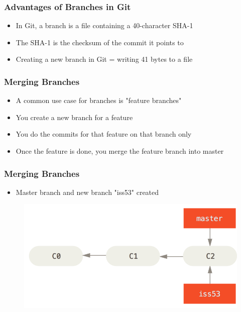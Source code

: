 \documentclass{beamer}
\begin{document}
\begin{frame}
	\frametitle{Advantages of Branches in Git}
	\begin{itemize}
		\item{In Git, a branch is a file containing a 40-character SHA-1}
		\item{The SHA-1 is the checksum of the commit it points to}
		\item{Creating a new branch in Git = writing 41 bytes to a file}
	\end{itemize}
\end{frame}

\begin{frame}
	\frametitle{Merging Branches}
	\begin{itemize}
		\item{A common use case for branches is "feature branches"}
		\item{You create a new branch for a feature}
		\item{You do the commits for that feature on that branch only}
		\item{Once the feature is done, you merge the feature branch into master}
	\end{itemize}
\end{frame}

\begin{frame}
	\frametitle{Merging Branches}
	\begin{itemize}
		\item{Master branch and new branch "iss53" created}
	\end{itemize}
	\begin{figure}
		\includegraphics[scale=0.4]{Merging_Branches-0.png}
	\end{figure}
\end{frame}
\end{document}
